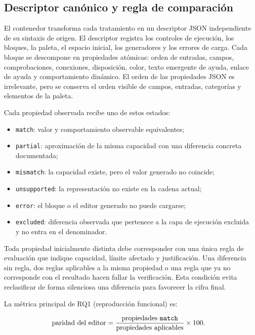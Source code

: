 \subsection{Descriptor canónico y regla de comparación}

El contenedor transforma cada tratamiento en un descriptor JSON independiente
de su sintaxis de origen. El descriptor registra los controles de ejecución,
los bloques, la paleta, el espacio inicial, los generadores y los errores de
carga. Cada bloque se descompone en propiedades atómicas: orden de entradas,
campos, comprobaciones, conexiones, disposición, color, texto emergente de ayuda,
enlace de ayuda y comportamiento dinámico. El orden de las propiedades JSON es irrelevante, pero
se conserva el orden visible de campos, entradas, categorías y elementos de la
paleta.

Cada propiedad observada recibe uno de estos estados:

\begin{itemize}
  \item \texttt{match}: valor y comportamiento observable equivalentes;
  \item \texttt{partial}: aproximación de la misma capacidad con una diferencia
  concreta documentada;
  \item \texttt{mismatch}: la capacidad existe, pero el valor generado no
  coincide;
  \item \texttt{unsupported}: la representación no existe en la cadena actual;
  \item \texttt{error}: el bloque o el editor generado no puede cargarse;
  \item \texttt{excluded}: diferencia observada que pertenece a la capa de
  ejecución excluida y no entra en el denominador.
\end{itemize}

Toda propiedad inicialmente distinta debe corresponder con una única regla de
evaluación que indique capacidad, límite afectado y justificación. Una
diferencia sin regla, dos reglas aplicables a la misma propiedad o una regla que
ya no corresponde con el resultado hacen fallar la verificación. Esta condición
evita reclasificar de forma silenciosa una diferencia para favorecer la cifra
final.

La métrica principal de RQ1 (reproducción funcional) es:

\begin{equation}
  \text{paridad del editor} =
  \frac{\text{propiedades \texttt{match}}}
       {\text{propiedades aplicables}} \times 100.
  \label{eq:paridad-editor}
\end{equation}

